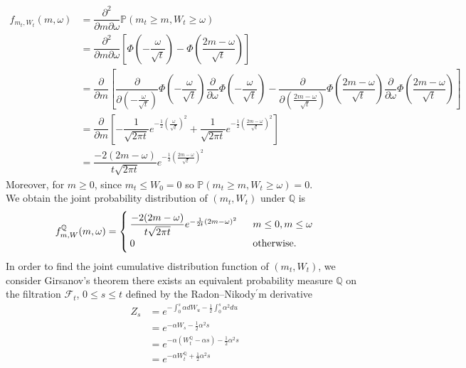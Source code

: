 \begin{align*}
	f_{m_t,W_t}(m, \omega)&=\dfrac{\partial^2}{\partial m \partial \omega}\mathbb{P}(m_t\geq m, W_t \geq \omega)\\
	&=\dfrac{\partial^2}{\partial m \partial \omega}\left[\Phi\left(-\dfrac{\omega}{\sqrt{t}}\right)-\Phi\left(\dfrac{2m-\omega}{\sqrt{t}}\right)\right]\\
	&=\dfrac{\partial}{\partial m}\left[\dfrac{\partial}{\partial\left(-\frac{\omega}{\sqrt{t}}\right)}\Phi\left(-\dfrac{\omega}{\sqrt{t}}\right)\dfrac{\partial}{\partial \omega}\Phi\left(-\dfrac{\omega}{\sqrt{t}}\right)-\dfrac{\partial}{\partial\left(\frac{2m-\omega}{\sqrt{t}}\right)}\Phi\left(\dfrac{2m-\omega}{\sqrt{t}}\right)\dfrac{\partial}{\partial \omega}\Phi\left(\dfrac{2m-\omega}{\sqrt{t}}\right)\right]\\
	&=\dfrac{\partial}{\partial m}\left[-\dfrac{1}{\sqrt{2\pi t}}e^{-\frac{1}{2}\left(\frac{\omega}{\sqrt{t}}\right)^2}+\dfrac{1}{\sqrt{2\pi t}}e^{-\frac{1}{2}\left(\frac{2m-\omega}{\sqrt{t}}\right)^2}\right]\\
	&=\dfrac{-2(2m-\omega)}{t\sqrt{2\pi t}}e^{-\frac{1}{2}\left(\frac{2m-\omega}{\sqrt{t}}\right)^2}
\end{align*}
Moreover, for $m\geq 0$, since $m_t\leq W_0=0$ so $\mathbb{P}(m_t\geq m, W_t\geq \omega)=0$.\\
We obtain the joint probability distribution of $(m_t, W_t)$ under $\mathbb{Q}$ is
\begin{align*}
f^\mathbb{Q}_{m,W}(m, \omega)= \begin{cases}
\dfrac{-2(2m-\omega)}{t\sqrt{2\pi t}}e^{-\frac{1}{2t}(2m-\omega)^2} \hspace{0.2cm} &m\leq 0,m\leq \omega   \nonumber \\
	0 &\text{otherwise.}  \nonumber
\end{cases}
\end{align*}
In order to find the joint cumulative distribution function of $(m_t, W_t)$, we consider Girsanov’s theorem there exists an equivalent probability
measure $\mathbb{Q}$ on the filtration $\mathcal{F}_t$, $0 \leq s \leq t$ defined by the Radon–Nikody$^\prime$m derivative
\begin{align*}
	Z_s&=e^{-\int_{0}^{s}\alpha dW_u-\frac{1}{2}\int_{0}^{s}\alpha^2du}\\
	&=e^{-\alpha W_s-\frac{1}{2}\alpha^2s}\\
	&=e^{-\alpha(W_t^\mathbb{Q}-\alpha s)-\frac{1}{2}\alpha^2 s }\\
	&=e^{-\alpha W_t^\mathbb{Q}+\frac{1}{2}\alpha^2s}
\end{align*}
